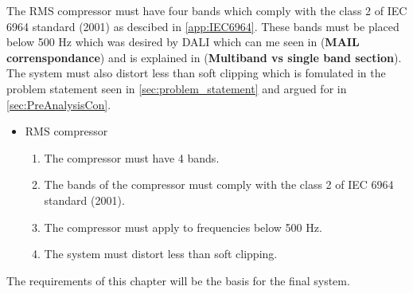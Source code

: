 The RMS compressor must have four bands which comply with the class 2 of IEC 6964 standard (2001) as descibed in \autoref{app:IEC6964}. These bands must be placed below 500 Hz which was desired by DALI which can me seen in (\textbf{MAIL correnspondance}) and is explained in (\textbf{Multiband vs single band section}). The system must also distort less than soft clipping which is fomulated in the problem statement seen in \autoref{sec:problem_statement} and argued for in \autoref{sec:PreAnalysisCon}.

\begin{itemize}
\item RMS compressor
\begin{enumerate}
\item [\textlabel{8}{bands}] The compressor must have 4 bands.\\
\item [\textlabel{9}{standardband}] The bands of the compressor must comply with the class 2 of IEC 6964 standard (2001).\\
\item [\textlabel{10}{500below}] The compressor must apply to frequencies below 500 Hz.\\
\item [\textlabel{11}{softclipping}] The system must distort less than soft clipping.
\end{enumerate}
\end{itemize}

The requirements of this chapter will be the basis for the final system.



